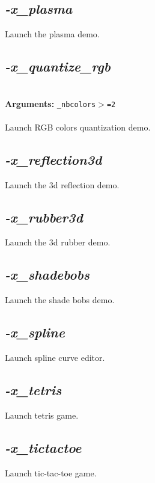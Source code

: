\documentclass[a4paper,11pt,twoside]{book}
\begin{document}
\subsection{\emph{-x\_plasma} }\vspace*{-0.5em}
Launch the plasma demo.


\subsection{\emph{-x\_quantize\_rgb} }\vspace*{-0.5em}
~\\\textbf{Arguments: } 
{\small \texttt{\_nbcolors$>$=2}}\\~\\
Launch RGB colors quantization demo.


\subsection{\emph{-x\_reflection3d} }\vspace*{-0.5em}
Launch the 3d reflection demo.


\subsection{\emph{-x\_rubber3d} }\vspace*{-0.5em}
Launch the 3d rubber demo.


\subsection{\emph{-x\_shadebobs} }\vspace*{-0.5em}
Launch the shade bobs demo.


\subsection{\emph{-x\_spline} }\vspace*{-0.5em}
Launch spline curve editor.


\subsection{\emph{-x\_tetris} }\vspace*{-0.5em}
Launch tetris game.


\subsection{\emph{-x\_tictactoe} }\vspace*{-0.5em}
Launch tic-tac-toe game.
\end{document}
